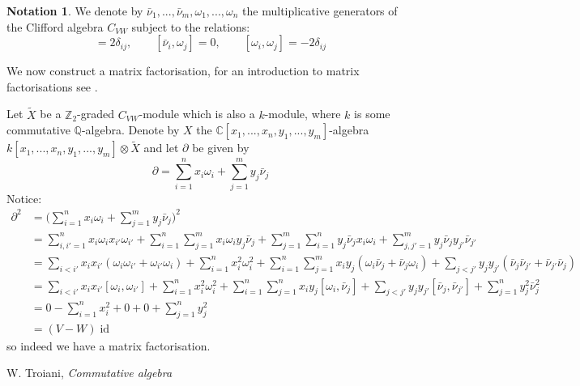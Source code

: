 \documentclass[12pt]{article}
\theoremstyle{plain}
\theoremstyle{definition}
\newtheorem{notation}[thm]{Notation}
\newcommand{\bb}[1]{\mathbb{#1}}
\begin{document}
\begin{notation}
We denote by $\bar{\nu}_1,...,\bar{\nu}_m, \omega_1,...,\omega_n$ the multiplicative generators of the Clifford algebra $C_{VW}$ subject to the relations:
\begin{equation}
[\bar{\nu}_i, \bar{\nu}_j] = 2\delta_{ij},\qquad [\bar{\nu}_i, \omega_j] = 0, \qquad [\omega_i,\omega_j] = -2\delta_{ij}
\end{equation}
\end{notation}
We now construct a matrix factorisation, for an introduction to matrix factorisations see \cite{commalg}.

Let $\tilde{X}$ be a $\bb{Z}_2$-graded $C_{VW}$-module which is also a $k$-module, where $k$ is some commutative $\bb{Q}$-algebra. Denote by $X$ the $\bb{C}[x_1,...,x_n,y_1,...,y_m]$-algebra $k[x_1,...,x_n,y_1,...,y_m]\otimes \tilde{X}$ and let $\partial$ be given by
\begin{equation}
\partial = \sum_{i = 1}^n x_i \omega_i + \sum_{j = 1}^m y_j \bar{\nu}_j
\end{equation} Notice:
\begin{align*}
\partial^2 &= \Big(\sum_{i = 1}^n x_i \omega_i + \sum_{j = 1}^m y_j \bar{\nu}_j\Big)^2\\
&= \sum_{i,i' = 1}^n x_i\omega_ix_{i'}\omega_{i'} + \sum_{i = 1}^n\sum_{j = 1}^m x_i\omega_i y_j\bar{\nu}_j + \sum_{j = 1}^m\sum_{i = 1}^n y_j\bar{\nu}_jx_i\omega_i + \sum_{j,j'=1}^m y_j\bar{\nu}_j y_{j'}\bar{\nu}_{j'}\\
&= \sum_{i < i'}x_ix_{i'}(\omega_i\omega_{i'} + \omega_{i'}\omega_i) + \sum_{i = 1}^n x_i^2 \omega_i^2 + \sum_{i = 1}^n\sum_{j = 1}^m x_iy_j(\omega_i\bar{\nu}_j + \bar{\nu}_j \omega_i) + \sum_{j < j'}y_jy_{j'}(\bar{\nu}_j\bar{\nu}_{j'} + \bar{\nu}_{j'}\bar{\nu}_j)\\
&= \sum_{i < i'}x_ix_{i'}[\omega_i, \omega_{i'}] + \sum_{i = 1}^n x_i^2 \omega_i^2 + \sum_{i=1}^n\sum_{j=1}^nx_iy_j[\omega_i, \bar{\nu}_j] + \sum_{j < j'}y_jy_{j'}[\bar{\nu}_j,\bar{\nu}_{j'}] + \sum_{j = 1}^n y_j^2\bar{\nu}_{j}^2\\
&= 0 - \sum_{i=1}^n x_i^2 + 0 + 0 + \sum_{j = 1}^ny_j^2\\
&= (V - W)\operatorname{id}
\end{align*}
so indeed we have a matrix factorisation.










































\begin{thebibliography}{9}
 W. Troiani, \emph{Commutative algebra}
\end{thebibliography}
\end{document}
